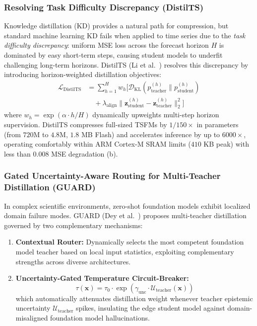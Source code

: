 \subsubsection{Resolving Task Difficulty Discrepancy (DistilTS)}
Knowledge distillation (KD) provides a natural path for compression, but standard machine learning KD fails when applied to time series due to the \emph{task difficulty discrepancy}: uniform MSE loss across the forecast horizon $H$ is dominated by easy short-term steps, causing student models to underfit challenging long-term horizons. DistilTS (Li et al.~\cite{Li2026DistilTS}) resolves this discrepancy by introducing horizon-weighted distillation objectives:
\begin{equation}
\begin{aligned}
    \mathcal{L}_{\text{DistilTS}} &= \sum_{h=1}^H w_h \Big[ \mathcal{D}_{\text{KL}}\left( p_{\text{teacher}}^{(h)} \parallel p_{\text{student}}^{(h)} \right) \\
    &\quad + \lambda_{\text{align}} \|\mathbf{z}_{\text{student}}^{(h)} - \mathbf{z}_{\text{teacher}}^{(h)}\|_2^2 \Big]
\end{aligned}
\end{equation}
where $w_h = \exp(\alpha \cdot h / H)$ dynamically upweights multi-step horizon supervision. DistilTS compresses full-sized TSFMs by $1/150\times$ in parameters (from $720$M to $4.8$M, $1.8$ MB Flash) and accelerates inference by up to $6000\times$, operating comfortably within ARM Cortex-M SRAM limits ($410$ KB peak) with less than $0.008$ MSE degradation (b).

\subsubsection{Gated Uncertainty-Aware Routing for Multi-Teacher Distillation (GUARD)}
In complex scientific environments, zero-shot foundation models exhibit localized domain failure modes. GUARD (Dey et al.~\cite{Dey2026GUARD}) proposes multi-teacher distillation governed by two complementary mechanisms:
\begin{enumerate}
    \item \textbf{Contextual Router:} Dynamically selects the most competent foundation model teacher based on local input statistics, exploiting complementary strengths across diverse architectures.
    \item \textbf{Uncertainty-Gated Temperature Circuit-Breaker:}
    \begin{equation}
        \tau(\mathbf{x}) = \tau_0 \cdot \exp\left( \gamma_{\text{unc}} \cdot \mathcal{U}_{\text{teacher}}(\mathbf{x}) \right)
    \end{equation}
    which automatically attenuates distillation weight whenever teacher epistemic uncertainty $\mathcal{U}_{\text{teacher}}$ spikes, insulating the edge student model against domain-misaligned foundation model hallucinations.
\end{enumerate}

